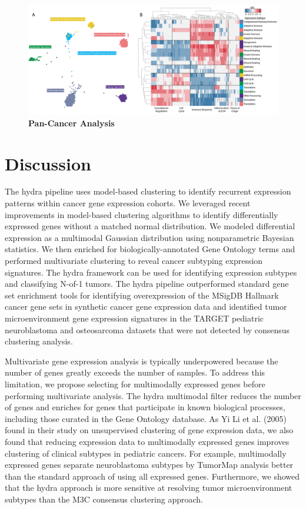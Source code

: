 \documentclass[10pt,letterpaper]{article}
\begin{document}
\begin{figure}[!h]
	\includegraphics[width=1.05\textwidth]{img/hydra-pan-small-round-blue-V2-2x}
	\caption{{\bf Pan-Cancer Analysis}}
	\label{hefig}
\end{figure}


\section*{Discussion}
The hydra pipeline uses model-based clustering to identify recurrent expression patterns within cancer gene expression cohorts. We leveraged recent improvements in model-based clustering algorithms to identify differentially expressed genes without a matched normal distribution. We modeled differential expression as a multimodal Gaussian distribution using nonparametric Bayesian statistics. We then enriched for biologically-annotated Gene Ontology terms and performed multivariate clustering to reveal cancer subtyping expression signatures. The hydra framework can be used for identifying expression subtypes and classifying N-of-1 tumors. The hydra pipeline outperformed standard gene set enrichment tools for identifying overexpression of the MSigDB Hallmark cancer gene sets in synthetic cancer gene expression data and identified tumor microenvironment gene expression signatures in the TARGET pediatric neuroblastoma and osteosarcoma datasets that were not detected by consensus clustering analysis. 

Multivariate gene expression analysis is typically underpowered because the number of genes greatly exceeds the number of samples. To address this limitation, we propose selecting for multimodally expressed genes before performing multivariate analysis. The hydra multimodal filter reduces the number of genes and enriches for genes that participate in known biological processes, including those curated in the Gene Ontology database. As Yi Li et al. (2005) found in their study on unsupervised clustering of gene expression data, we also found that reducing expression data to multimodally expressed genes improves clustering of clinical subtypes in pediatric cancers. For example, multimodally expressed genes separate neuroblastoma subtypes by TumorMap analysis better than the standard approach of using all expressed genes. Furthermore, we showed that the hydra approach is more sensitive at resolving tumor microenvironment subtypes than the M3C consensus clustering approach.
\end{document}
